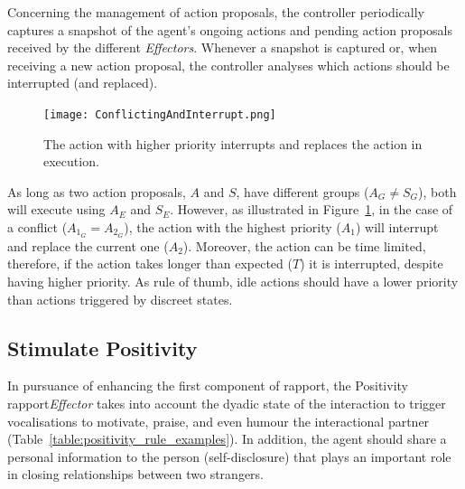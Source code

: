 Concerning the management of action proposals, the controller periodically captures a snapshot of the agent's ongoing actions and pending action proposals received by the different \textit{Effectors}. Whenever a snapshot is captured or, when receiving a new action proposal, the controller analyses which actions should be interrupted (and replaced). 

\begin{figure}[H]
	\centering
	\texttt{[image: ConflictingAndInterrupt.png]}
	\caption{The action with higher priority interrupts and replaces the action in execution.}	
	\label{fig:conflict_interrupt}
\end{figure}

As long as two action proposals, $A$ and $S$, have different groups ($A_G \neq S_G$), both will execute using $A_E$ and $S_E$. However, as illustrated in Figure~\ref{fig:conflict_interrupt}, in the case of a conflict ($A_{1_G}=A_{2_G}$), the action with the highest priority ($A_1$) will interrupt and replace the current one ($A_2$). Moreover, the action can be time limited, therefore, if the action takes longer than expected ($T$) it is interrupted, despite having higher priority. As rule of thumb, idle actions should have a lower priority than actions triggered by discreet states.

\subsection{Stimulate Positivity}

In pursuance of enhancing the first component of rapport, the Positivity rapport\textit{Effector} takes into account the dyadic state of the interaction to trigger vocalisations to motivate, praise, and even humour the interactional partner (Table~\ref{table:positivity_rule_examples}). In addition, the agent should share a personal information to the person (self-disclosure) that plays an important role in closing relationships between two strangers\cite{Kang2011}. 



